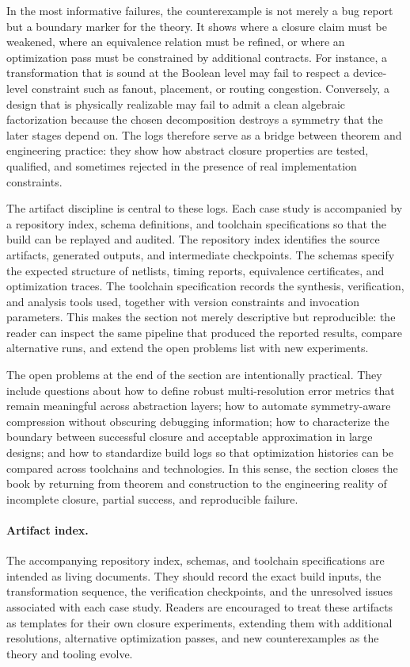 In the most informative failures, the counterexample is not merely a bug report but a boundary marker for the theory. It shows where a closure claim must be weakened, where an equivalence relation must be refined, or where an optimization pass must be constrained by additional contracts. For instance, a transformation that is sound at the Boolean level may fail to respect a device-level constraint such as fanout, placement, or routing congestion. Conversely, a design that is physically realizable may fail to admit a clean algebraic factorization because the chosen decomposition destroys a symmetry that the later stages depend on. The logs therefore serve as a bridge between theorem and engineering practice: they show how abstract closure properties are tested, qualified, and sometimes rejected in the presence of real implementation constraints.

The artifact discipline is central to these logs. Each case study is accompanied by a repository index, schema definitions, and toolchain specifications so that the build can be replayed and audited. The repository index identifies the source artifacts, generated outputs, and intermediate checkpoints. The schemas specify the expected structure of netlists, timing reports, equivalence certificates, and optimization traces. The toolchain specification records the synthesis, verification, and analysis tools used, together with version constraints and invocation parameters. This makes the section not merely descriptive but reproducible: the reader can inspect the same pipeline that produced the reported results, compare alternative runs, and extend the open problems list with new experiments.

The open problems at the end of the section are intentionally practical. They include questions about how to define robust multi-resolution error metrics that remain meaningful across abstraction layers; how to automate symmetry-aware compression without obscuring debugging information; how to characterize the boundary between successful closure and acceptable approximation in large designs; and how to standardize build logs so that optimization histories can be compared across toolchains and technologies. In this sense, the section closes the book by returning from theorem and construction to the engineering reality of incomplete closure, partial success, and reproducible failure.

\paragraph{Artifact index.} The accompanying repository index, schemas, and toolchain specifications are intended as living documents. They should record the exact build inputs, the transformation sequence, the verification checkpoints, and the unresolved issues associated with each case study. Readers are encouraged to treat these artifacts as templates for their own closure experiments, extending them with additional resolutions, alternative optimization passes, and new counterexamples as the theory and tooling evolve.

